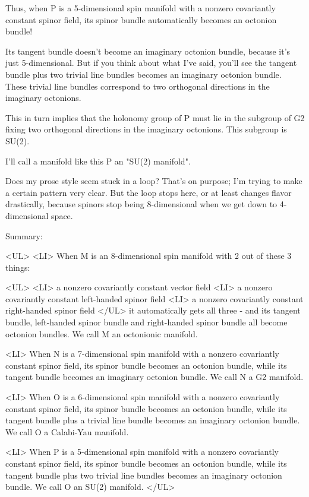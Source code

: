 Thus, when P is a 5-dimensional spin manifold with a nonzero
covariantly constant spinor field, its spinor bundle automatically
becomes an octonion bundle!

Its tangent bundle doesn't become an imaginary octonion bundle,
because it's just 5-dimensional.  But if you think about what I've
said, you'll see the tangent bundle plus two trivial line bundles
becomes an imaginary octonion bundle.  These trivial line bundles
correspond to two orthogonal directions in the imaginary octonions.

This in turn implies that the holonomy group of P must lie in the 
subgroup of G2 fixing two orthogonal directions in the imaginary 
octonions.  This subgroup is SU(2).  

I'll call a manifold like this P an "SU(2) manifold".

Does my prose style seem stuck in a loop?  That's on purpose;
I'm trying to make a certain pattern very clear.  But the loop stops
here, or at least changes flavor drastically, because spinors stop 
being 8-dimensional when we get down to 4-dimensional space.   

Summary: 

<UL>
<LI>
When M is an 8-dimensional spin manifold with 2 out of these 3 things: 

<UL>
<LI>
a nonzero covariantly constant vector field
<LI>
a nonzero covariantly constant left-handed spinor field
<LI>
a nonzero covariantly constant right-handed spinor field
</UL>
it automatically gets all three - and its tangent bundle, 
left-handed spinor bundle and right-handed spinor bundle all
become octonion bundles.   We call M an octonionic manifold.

<LI>
When N is a 7-dimensional spin manifold with a nonzero
covariantly constant spinor field, its spinor bundle becomes an
octonion bundle, while its tangent bundle becomes an imaginary 
octonion bundle.   We call N a G2 manifold.  

<LI>
When O is a 6-dimensional spin manifold with a nonzero
covariantly constant spinor field, its spinor bundle becomes an
octonion bundle, while its tangent bundle plus a trivial line bundle
becomes an imaginary octonion bundle.  We call O a Calabi-Yau
manifold.

<LI>
When P is a 5-dimensional spin manifold with a nonzero
covariantly constant spinor field, its spinor bundle becomes an
octonion bundle, while its tangent bundle plus two trivial line 
bundles becomes an imaginary octonion bundle.   We call O an 
SU(2) manifold.  
</UL>

